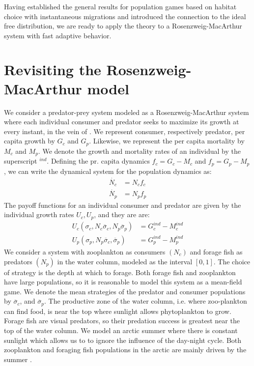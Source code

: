 Having established the general results for population games based on habitat choice with instantaneous migrations and introduced the connection to the ideal free distribution, we are ready to apply the theory to a Rosenzweig-MacArthur system with fast adaptive behavior.
\section{Revisiting the Rosenzweig-MacArthur model}
\label{sec:model_rm}
We consider a predator-prey system modeled as a Rosenzweig-MacArthur system where each individual consumer and predator seeks to maximize its growth at every instant, in the vein of \citep{kvrivan2009evolutionary}. We represent consumer, respectively predator, per capita growth by $G_c$ and $G_p$. Likewise, we represent the per capita mortality by $M_c$ and $M_p$. We denote the growth and mortality rates of an individual by the superscript $^{ind}$.
Defining the pr. capita dynamics $f_c = G_c - M_c$ and $f_p = G_p - M_p$, we can write the dynamical system for the population dynamics as:
\begin{equation}
  \label{eq:dynamics}
  \begin{split}
    \dot{N_c} &= N_c f_c \\
    \dot{N_p} &= N_p f_p
  \end{split}
\end{equation}
The payoff functions for an individual consumer and predator are given by the individual growth rates $U_c,U_p$, and they are are:
\begin{equation}
  \begin{split}
    U_c(\sigma_c, N_c \overbar{\sigma}_c, N_p\overbar{\sigma}_p) &=  G_c^{ind} - M_c^{ind} \\
    U_p(\sigma_p, N_p \overbar{\sigma}_c, \overbar{\sigma}_p) &= G_p^{ind} - M_p^{ind}
  \end{split}
\end{equation}
We consider a system with zooplankton as consumers $(N_c)$ and forage fish as predators $(N_p)$ in the water column, modeled as the interval $[0,1]$. The choice of strategy is the depth at which to forage. Both forage fish and zooplankton have large populations, so it is reasonable to model this system as a mean-field game. We denote the mean strategies of the predator and consumer populations by $\overbar{\sigma}_c$, and $\overbar{\sigma}_p$. The productive zone of the water column, i.e. where zoo-plankton can find food, is near the top where sunlight allows phytoplankton to grow. Forage fish are visual predators, so their predation success is greatest near the top of the water column. We model an arctic summer where there is constant sunlight which allows us to to ignore the influence of the day-night cycle. Both zooplankton and foraging fish populations in the arctic are mainly driven by the summer \citep{astthorsson2003seasonal, mueter2016ecology}.

